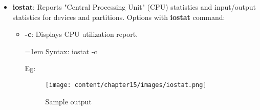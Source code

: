 \setlength{\columnsep}{3pt}
\begin{flushleft}

\bigskip

\begin{itemize}
	\item \textbf{iostat}: Reports "Central Processing Unit" (CPU) statistics and input/output statistics for devices and partitions.
	\newline
	Options with \textbf{iostat} command:
	\begin{itemize}
		\item \textbf{-c}: Displays CPU utilization report.
		\bigskip
		\begin{tcolorbox}[breakable,notitle,boxrule=0pt,colback=pink,colframe=pink]
			\color{black}
			\font=1em
			Syntax: iostat -c
			\font=4pt
		\end{tcolorbox}
		Eg:
		\begin{figure}[h!]
			\centering
			\texttt{[image: content/chapter15/images/iostat.png]}
			\caption{Sample output}
			\label{fig:output}
		\end{figure}
	

\end{itemize}
\end{itemize}
\end{flushleft}
